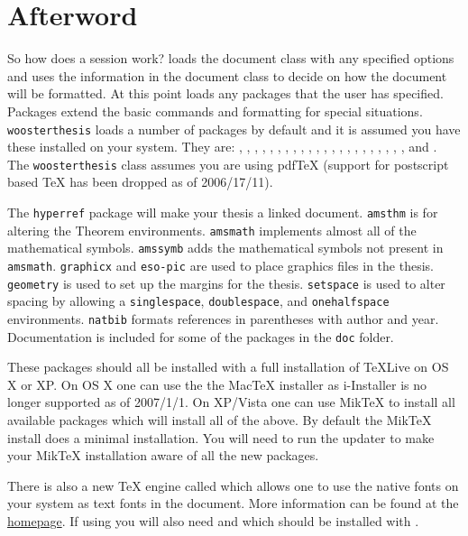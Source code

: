 \chapter*{Afterword}\label{after}
So how does a \lt session work? \lt loads the document class with any specified options and uses the information in the document class to decide on how the document will be formatted. At this point \lt loads any packages that the user has specified. Packages extend the basic \lt commands and formatting for special situations. \verb|woosterthesis| loads a number of packages by default and it is assumed you have these installed on your system. They are:
,
,
,
,
,
,
,
,
,
,
,
,
,
,
,
,
,
,
,
,
,
,
and .
The \texttt{woosterthesis} class assumes you are using pdfTeX (support for postscript based TeX has been dropped as of 2006/17/11). 

The \texttt{hyperref} package will make your thesis a linked document. \texttt{amsthm} is for altering the Theorem environments. \texttt{amsmath} implements almost all of the mathematical symbols. \texttt{amssymb} adds the mathematical symbols not present in \texttt{amsmath}. \texttt{graphicx} and \texttt{eso-pic} are used to place graphics files in the thesis. \texttt{geometry} is used to set up the margins for the thesis. \texttt{setspace} is used to alter spacing by allowing a \texttt{singlespace}, \texttt{doublespace}, and \texttt{onehalfspace} environments. \texttt{natbib} formats references in parentheses with author and year.  Documentation is included for some of the packages in the \verb|doc| folder.

These packages should all be installed with a full installation of TeXLive on OS X or XP. On OS X one can use the the MacTeX installer as i-Installer is no longer supported as of 2007/1/1. On XP/Vista one can use MikTeX to install all available packages which will install all of the above. By default the MikTeX install does a minimal installation. You will need to run the updater to make your MikTeX installation aware of all the new packages.

There is also a new \TeX{} engine called \xt which allows one to use the native fonts on your system as text fonts in the document. More information can be found at the \href{http://scripts.sil.org/cms/scripts/page.php?site_id=nrsi&id=xetex}{\xt homepage}. If using \xt you will also need  and  which should be installed with \xt.


